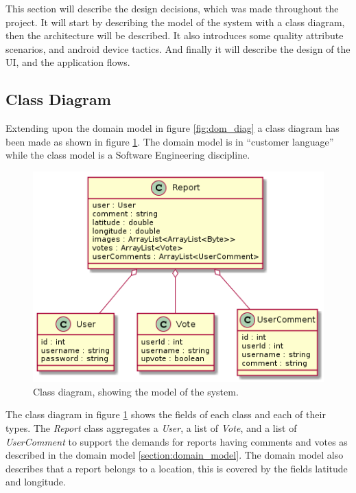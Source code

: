 
This section will describe the design decisions, which was made throughout the project. It will start by describing the model of the system with a class diagram, then the architecture will be described. It also introduces some quality attribute scenarios, and android device tactics. And finally it will describe the design of the UI, and the application flows.


\subsection{Class Diagram}
Extending upon the  domain model in figure \ref{fig:dom_diag} a class diagram has been made as shown in figure \ref{fig:class_diagram}. The domain model is in “customer language” while the class model is a Software Engineering discipline. 

\begin{figure}[hbt]
\centering
\includegraphics[width=.6\textwidth]{images/Class_model_diagram}
\caption{Class diagram, showing the model of the system.} \label{fig:class_diagram}
\end{figure}

The class diagram in figure \ref{fig:class_diagram} shows the fields of each class and each of their types. The \textit{Report} class aggregates a \textit{User}, a list of \textit{Vote}, and a list of \textit{UserComment} to support the demands for reports having comments and votes as described in the domain model \ref{section:domain_model}. The domain model also describes that a report belongs to a location, this is covered by the fields latitude and longitude. 

%
%

